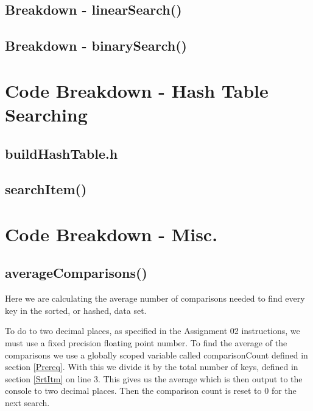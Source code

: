 \documentclass[12pt, letterpaper]{article}
\begin{document}
\subsection{Breakdown - linearSearch()} \label{LinSchCde}


\subsection{Breakdown - binarySearch()} \label{BinSchCde}

\newpage

\section{Code Breakdown - Hash Table Searching}
\subsection{buildHashTable.h} \label{BldHshTbl}


\subsection{searchItem()} \label{HshSchCde}

\newpage

\section{Code Breakdown - Misc.} \label{Misc}
\subsection{averageComparisons()} \label{AvgComp}
Here we are calculating the average number of comparisons needed to find every key in the sorted, or hashed, data set.

To do to two decimal places, as specified in the Assignment 02 instructions, we must use a fixed precision floating point number.
To find the average of the comparisons we use a globally scoped variable called comparisonCount defined in section \ref{Prereq}.
With this we divide it by the total number of keys, defined in section \ref{SrtItm} on line 3.
This gives us the average which is then output to the console to two decimal places.
Then the comparison count is reset to 0 for the next search.
\end{document}
